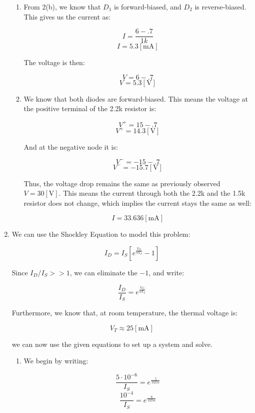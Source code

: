 \begin{enumerate}
\begin{enumerate}
      \item 

        From 2(b), we know that $D_1$ is forward-biased, and $D_2$ is reverse-biased. This gives us the current as:

        $$I=\frac{6-.7}{1k}$$
        $$\boxed{I=5.3[\si{\milli\ampere}]}$$

        The voltage is then:

        $$V=6-.7$$
        $$\boxed{V=5.3[\si{\volt}]}$$

      \item 

        We know that both diodes are forward-biased. This means the voltage at the positive terminal of the 2.2k resistor is:

        $$V^+=15-.7$$
        $$V^+=14.3[\si{\volt}]$$

        And at the negative node it is:

        $$V^-=-15-.7$$
        $$V^-=-15.7[\si{\volt}]$$

        Thus, the voltage drop remains the same as previously observed $\boxed{V=30[\si{\volt}]}$. This means the current through both the 2.2k and the 1.5k resistor does not change, which implies the current stays the same as well:

        $$\boxed{I=33.636[\si{\milli\ampere}]}$$

    \end{enumerate}

  \item We can use the Shockley Equation to model this problem:

    $$I_D=I_S\left[ e^{\frac{V_D}{nV_T}} -1\right]$$

    Since $I_D/I_S>>1$, we can eliminate the $-1$, and write:

    $$\frac{I_D}{I_S}=e^{\frac{V_D}{nV_T}}$$

    Furthermore, we know that, at room temperature, the thermal voltage is:

    $$V_T\approx 25[\si{\milli\ampere}]$$

    we can now use the given equations to set up a system and solve.

    \begin{enumerate}

      \item 

        We begin by writing:

        $$\frac{5\cdot10^{-6}}{I_S}=e^{\frac{.5}{.025n}}$$
        $$\frac{10^{-4}}{I_S}=e^{\frac{.6}{.025n}}$$


\end{enumerate}
\end{enumerate}

